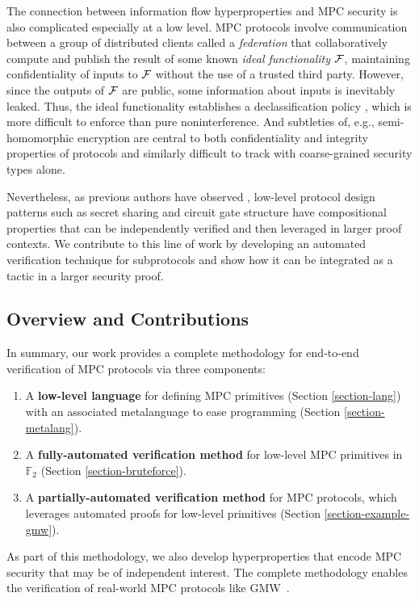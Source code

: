 The connection between information flow hyperproperties and MPC
security is also complicated especially at a low level.  MPC protocols
involve communication between a group of distributed clients called a
\emph{federation} that collaboratively compute and publish the result
of some known \emph{ideal functionality} $\mathcal{F}$, maintaining
confidentiality of inputs to $\mathcal{F}$ without the use of a trusted
third party. However, since the outputs of $\mathcal{F}$ are public, some
information about inputs is inevitably leaked. Thus, the ideal
functionality establishes a declassification policy
\cite{sabelfeld2009declassification}, which is more difficult to
enforce than pure noninterference.  And subtleties of, e.g.,
semi-homomorphic encryption are central to both confidentiality and
integrity properties of protocols and similarly difficult to track
with coarse-grained security types alone.

Nevertheless, as previous authors have observed
\cite{5a51987acaa84c43bb4bf5bcc7d01683}, low-level protocol design
patterns such as secret sharing and circuit gate structure have
compositional properties that can be independently verified and then
leveraged in larger proof contexts. We contribute to this line of work
by developing an automated verification technique for subprotocols and
show how it can be integrated as a tactic in a larger security proof.

\subsection{Overview and Contributions}

In summary, our work provides a complete methodology for end-to-end verification
of MPC protocols via three components:
%
\begin{enumerate}
\item A \textbf{low-level language} for defining MPC primitives
  (Section \ref{section-lang}) with an associated metalanguage
  to ease programming (Section \ref{section-metalang}).
\item A \textbf{fully-automated verification method} for low-level MPC
  primitives in $\mathbb{F}_2$ (Section \ref{section-bruteforce}).
\item A \textbf{partially-automated verification method} for
  MPC protocols, which leverages automated proofs for
  low-level primitives (Section \ref{section-example-gmw}).
\end{enumerate}
%
As part of this methodology, we also develop hyperproperties that
encode MPC security that may be of independent interest. The complete
methodology enables the verification of real-world MPC protocols like
GMW~\cite{goldreich2019play}. 

